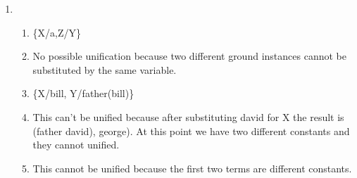 \documentclass[11pt]{article}
\begin{document}
\begin{enumerate}[1.]
\item
\begin{enumerate}
\item
\{X/a,Z/Y\}
\item
No possible unification because two different ground instances cannot be substituted by the same variable.
\item
\{X/bill, Y/father(bill)\}
\item
This can't be unified because after substituting david for X the result is (father david), george). At this point we have two different constants and they cannot unified.   
\item
This cannot be unified because the first two terms are different constants. 
\end{enumerate}
\end{enumerate}
\end{document}
